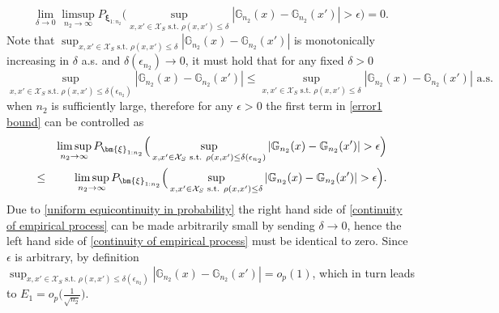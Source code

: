 \documentclass[mnsc,blindrev]{informs4} %
\newcommand{\abs}[1]{\left \vert #1 \right\vert}
\begin{document}
\begin{equation}\label{uniform equicontinuity in probability}
\lim_{\delta\to 0}\limsup_{n_2\to\infty}P_{\bm{\xi}_{1:n_2}}\Big(\sup_{x,x'\in\mathcal X_S\text{ s.t. }\rho(x,x')\leq \delta}\abs{\mathbb G_{n_2}(x)-\mathbb G_{n_2}(x')}> \epsilon\Big)=0.
\end{equation}
Note that $\sup_{x,x'\in\mathcal X_S\text{ s.t. }\rho(x,x')\leq \delta}\abs{\mathbb G_{n_2}(x)-\mathbb G_{n_2}(x')}$ is monotonically increasing in $\delta$ a.s. and $\delta(\epsilon_{n_2})\to 0$, it must hold that for any fixed $\delta>0$
\begin{equation*}
\sup_{x,x'\in\mathcal X_S\text{ s.t. }\rho(x,x')\leq \delta(\epsilon_{n_2})}\abs{\mathbb G_{n_2}(x)-\mathbb G_{n_2}(x')}\leq\sup_{x,x'\in\mathcal X_S\text{ s.t. }\rho(x,x')\leq \delta}\abs{\mathbb G_{n_2}(x)-\mathbb G_{n_2}(x')}\text{\ \ a.s.}
\end{equation*}
when $n_2$ is sufficiently large, therefore for any $\epsilon>0$ the first term in \eqref{error1 bound} can be controlled as
\begin{eqnarray}
\notag&&\limsup_{n_2\to\infty} P_{\bm{\xi}_{1:n_2}}\Big(\sup_{x,x'\in\mathcal X_S\text{ s.t. }\rho(x,x')\leq \delta(\epsilon_{n_2})}\abs{\mathbb G_{n_2}(x)-\mathbb G_{n_2}(x')}>\epsilon\Big)\\
&\leq&\limsup_{n_2\to\infty} P_{\bm{\xi}_{1:n_2}}\Big(\sup_{x,x'\in\mathcal X_S\text{ s.t. }\rho(x,x')\leq \delta}\abs{\mathbb G_{n_2}(x)-\mathbb G_{n_2}(x')}>\epsilon\Big).\label{continuity of empirical process}
\end{eqnarray}
Due to \eqref{uniform equicontinuity in probability} the right hand side of \eqref{continuity of empirical process} can be made arbitrarily small by sending $\delta\to 0$, hence the left hand side of \eqref{continuity of empirical process} must be identical to zero. Since $\epsilon$ is arbitrary, by definition $\sup_{x,x'\in\mathcal X_S\text{ s.t. }\rho(x,x')\leq \delta(\epsilon_{n_2})}\abs{\mathbb G_{n_2}(x)-\mathbb G_{n_2}(x')}=o_p(1)$, which in turn leads to $E_1 = o_p\big(\frac{1}{\sqrt{n_2}}\big)$.
\end{document}
